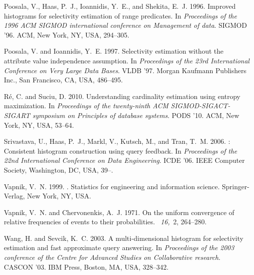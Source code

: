 \begin{thebibliography}{}
{\sc Poosala, V.}, {\sc Haas, P.~J.}, {\sc Ioannidis, Y.~E.}, {\sc and} {\sc
  Shekita, E.~J.} 1996.
\newblock Improved histograms for selectivity estimation of range predicates.
\newblock In {\em Proceedings of the 1996 ACM SIGMOD international conference
  on Management of data}. SIGMOD '96. ACM, New York, NY, USA, 294--305.

{\sc Poosala, V.} {\sc and} {\sc Ioannidis, Y.~E.} 1997.
\newblock Selectivity estimation without the attribute value independence
  assumption.
\newblock In {\em Proceedings of the 23rd International Conference on Very
  Large Data Bases}. VLDB '97. Morgan Kaufmann Publishers Inc., San Francisco,
  CA, USA, 486--495.

{\sc R\'{e}, C.} {\sc and} {\sc Suciu, D.} 2010.
\newblock Understanding cardinality estimation using entropy maximization.
\newblock In {\em Proceedings of the twenty-ninth ACM SIGMOD-SIGACT-SIGART
  symposium on Principles of database systems}. PODS '10. ACM, New York, NY,
  USA, 53--64.

{\sc Srivastava, U.}, {\sc Haas, P.~J.}, {\sc Markl, V.}, {\sc Kutsch, M.},
  {\sc and} {\sc Tran, T.~M.} 2006.
: Consistent histogram construction using query feedback.
\newblock In {\em Proceedings of the 22nd International Conference on Data
  Engineering}. ICDE '06. IEEE Computer Society, Washington, DC, USA, 39--.

{\sc Vapnik, V.~N.} 1999.
.
\newblock Statistics for engineering and information science. Springer-Verlag,
  New York, NY, USA.

{\sc Vapnik, V.~N.} {\sc and} {\sc Chervonenkis, A.~J.} 1971.
\newblock On the uniform convergence of relative frequencies of events to their
  probabilities.
~{\em 16,\/}~2,
  264--280.

{\sc Wang, H.} {\sc and} {\sc Sevcik, K.~C.} 2003.
\newblock A multi-dimensional histogram for selectivity estimation and fast
  approximate query answering.
\newblock In {\em Proceedings of the 2003 conference of the Centre for Advanced
  Studies on Collaborative research}. CASCON '03. IBM Press, Boston, MA, USA,
  328--342.


\end{thebibliography}
